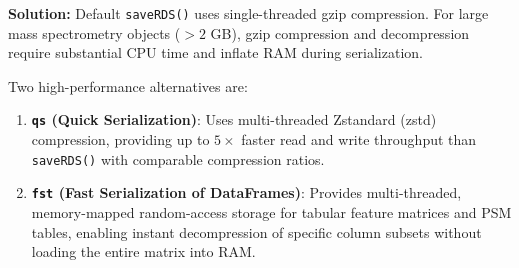 \documentclass[11pt,twoside,openright]{book}
\begin{document}
\noindent\textbf{Solution:}\enspace
Default \texttt{saveRDS()} uses single-threaded gzip compression. For large mass spectrometry objects ($> 2$ GB), gzip compression and decompression require substantial CPU time and inflate RAM during serialization.

Two high-performance alternatives are:
\begin{enumerate}
\item \textbf{\texttt{qs} (Quick Serialization)}: Uses multi-threaded Zstandard (zstd) compression, providing up to $5\times$ faster read and write throughput than \texttt{saveRDS()} with comparable compression ratios.
\item \textbf{\texttt{fst} (Fast Serialization of DataFrames)}: Provides multi-threaded, memory-mapped random-access storage for tabular feature matrices and PSM tables, enabling instant decompression of specific column subsets without loading the entire matrix into RAM.
\end{enumerate}
\end{document}
